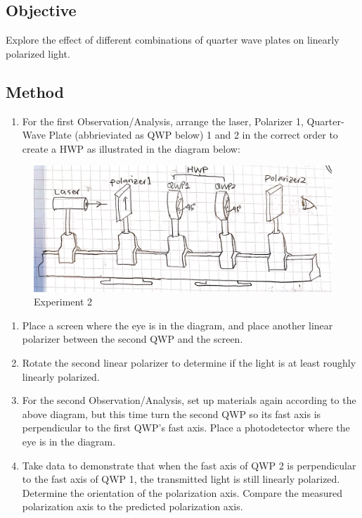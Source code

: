\documentclass[11pt]{article}
\makeatletter
\def\maxwidth{\ifdim\Gin@nat@width>\linewidth\linewidth
    \else\Gin@nat@width\fi}
\let\Oldincludegraphics\includegraphics
\renewcommand{\includegraphics}[1]{\Oldincludegraphics[width=.8\maxwidth]{#1}}
\providecommand{\tightlist}{%
      \setlength{\itemsep}{0pt}\setlength{\parskip}{0pt}}
\makeatother
\begin{document}
\hypertarget{objective}{%
\subsection{Objective}\label{objective}}

Explore the effect of different combinations of quarter wave plates on
linearly polarized light.

\hypertarget{method}{%
\subsection{Method}\label{method}}

\begin{enumerate}
\def\labelenumi{\arabic{enumi}.}
\tightlist
\item
  For the first Observation/Analysis, arrange the laser, Polarizer 1,
  Quarter-Wave Plate (abbrieviated as QWP below) 1 and 2 in the correct
  order to create a HWP as illustrated in the diagram below:
\end{enumerate}

\begin{figure}
\centering
\includegraphics{fig2.jpg}
\caption{Experiment 2}
\end{figure}

\begin{enumerate}
\def\labelenumi{\arabic{enumi}.}
\setcounter{enumi}{1}
\item
  Place a screen where the eye is in the diagram, and place another
  linear polarizer between the second QWP and the screen.
\item
  Rotate the second linear polarizer to determine if the light is at
  least roughly linearly polarized.
\item
  For the second Observation/Analysis, set up materials again according
  to the above diagram, but this time turn the second QWP so its fast
  axis is perpendicular to the first QWP's fast axis. Place a
  photodetector where the eye is in the diagram.
\item
  Take data to demonstrate that when the fast axis of QWP 2 is
  perpendicular to the fast axis of QWP 1, the transmitted light is
  still linearly polarized. Determine the orientation of the
  polarization axis. Compare the measured polarization axis to the
  predicted polarization axis.
\end{enumerate}
\end{document}
